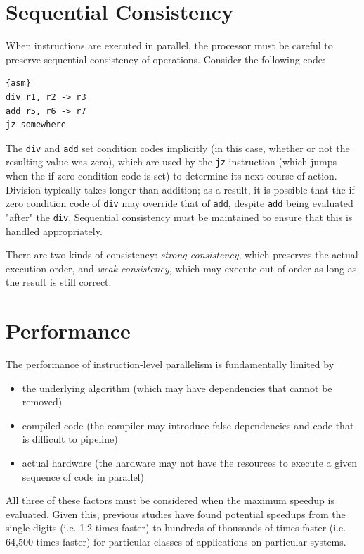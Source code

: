 \section{Sequential Consistency}
When instructions are executed in parallel, the processor must be careful to preserve sequential consistency of operations. Consider the following code:
\begin{lstlisting}{asm}
div r1, r2 -> r3
add r5, r6 -> r7
jz somewhere
\end{lstlisting}

The \texttt{div} and \texttt{add} set condition codes implicitly (in this case, whether or not the resulting value was zero), which are used by the \texttt{jz} instruction (which jumps when the if-zero condition code is set) to determine its next course of action. Division typically takes longer than addition; as a result, it is possible that the if-zero condition code of \texttt{div} may override that of \texttt{add}, despite \texttt{add} being evaluated "after" the \texttt{div}. Sequential consistency must be maintained to ensure that this is handled appropriately.

There are two kinds of consistency: \textit{strong consistency}, which preserves the actual execution order, and \textit{weak consistency}, which may execute out of order as long as the result is still correct.

\section{Performance}
The performance of instruction-level parallelism is fundamentally limited by \begin{itemize}
\item the underlying algorithm (which may have dependencies that cannot be removed)
\item compiled code (the compiler may introduce false dependencies and code that is difficult to pipeline)
\item actual hardware (the hardware may not have the resources to execute a given sequence of code in parallel)
\end{itemize}

All three of these factors must be considered when the maximum speedup is evaluated. Given this, previous studies have found potential speedups from the single-digits (i.e. 1.2 times faster) to hundreds of thousands of times faster (i.e. 64,500 times faster) for particular classes of applications on particular systems.

